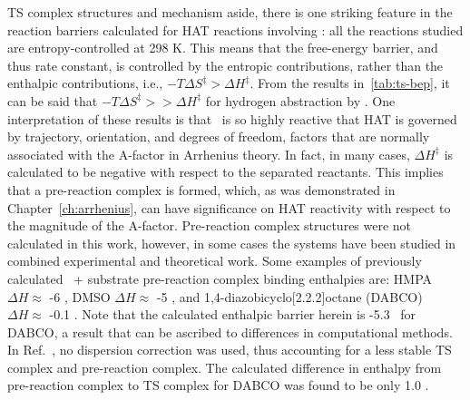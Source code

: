 
TS complex structures and mechanism aside, there is one striking feature in the
reaction barriers calculated for HAT reactions involving \cumo: all the
reactions studied are entropy-controlled at 298 K. This means that the
free-energy barrier, and thus rate constant, is controlled by the entropic
contributions, rather than the enthalpic contributions, i.e., $-T\Delta
S^\ddagger > \Delta H^\ddagger$. From the results in~\ref{tab:ts-bep}, it can
be said that $-T\Delta S^\ddagger >> \Delta H^\ddagger$ for hydrogen
abstraction by \cumo. One interpretation of these results is that \cumo\ is so
highly reactive that HAT is governed by trajectory, orientation, and degrees of
freedom, factors that are normally associated with the A-factor in Arrhenius
theory. In fact, in many cases, $\Delta H^\ddagger$ is calculated to be
negative with respect to the separated reactants. This implies that a
pre-reaction complex is formed, which, as was demonstrated in
Chapter~\ref{ch:arrhenius}, can have significance on HAT reactivity with
respect to the magnitude of the A-factor. Pre-reaction complex structures were
not calculated in this work, however, in some cases the systems have been
studied in combined experimental and theoretical work. Some examples of
previously calculated \cumo\ + substrate pre-reaction complex binding
enthalpies are: HMPA\footnotemark\ $\Delta H \approx$ -6 \kcalmol, DMSO $\Delta
H \approx$ -5 \kcalmol, and 1,4-diazobicyclo[2.2.2]octane
(DABCO)\cite{Salamone2011b} $\Delta H \approx$ -0.1 \kcalmol. Note that the
calculated enthalpic barrier herein is -5.3 \kcalmol\ for DABCO, a result that
can be ascribed to differences in computational methods. In
Ref.~, no dispersion correction was used, thus
accounting for a less stable TS complex and pre-reaction complex. The
calculated difference in enthalpy from pre-reaction complex to TS complex for
DABCO was found to be only 1.0 \kcalmol.


